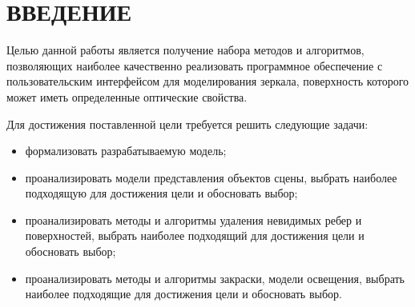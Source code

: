 \chapter*{ВВЕДЕНИЕ}
{}

Целью данной работы является получение набора методов и алгоритмов, позволяющих наиболее качественно реализовать программное обеспечение с пользовательским интерфейсом для моделирования зеркала, поверхность которого может иметь определенные оптические свойства.

Для достижения поставленной цели требуется решить следующие задачи:

\begin{itemize}
    \item формализовать разрабатываемую модель;
    \item проанализировать модели представления объектов сцены, выбрать наиболее подходящую для достижения цели и обосновать выбор;
    \item проанализировать методы и алгоритмы удаления невидимых ребер и поверхностей, выбрать наиболее подходящий для достижения цели и обосновать выбор;
    \item проанализировать методы и алгоритмы закраски, модели освещения, выбрать наиболее подходящие для достижения цели и обосновать выбор.
\end{itemize}

\pagebreak